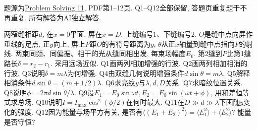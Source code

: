 题源为\href{https://ocw.mit.edu/courses/8-02-physics-ii-electricity-and-magnetism-spring-2007/resources/solving11/}{Problem Solving 11}, PDF第1--12页. Q1--Q12全部保留, 答题页重复题干不再重复. 所有解答为AI独立解答.

\begin{exercise}
两窄缝相距$d$, 在$x=0$平面, 屏在$x=D$, 上缝编号1、下缝编号2. $O$是缝中点向屏作垂线的足点, 正$y$向上, 屏上$P$距$O$的有符号距离为$y$, $\theta$从正$x$轴量到缝中点指向$P$的射线. 两束同频、同偏振、相干的光从缝同相出发, 每束场幅度$E_0$. 第2缝到$P$比第1缝路长$\delta=r_2-r_1$. 采用远场近似.
Q1画两列相加增强的行波.
Q2画两列相加相消的行波.
Q3说明$\delta=m\lambda$为何增强.
Q4由双缝几何说明增强条件$d\sin\theta=m\lambda$.
Q5解释相消条件$d\sin\theta=(m+1/2)\lambda$.
Q6求亮纹$y$与$\lambda,d,D$关系.
Q7求暗纹位置关系.
Q8说明$\phi=2\pi d\sin\theta/\lambda$.
Q9设$E_1=E_0\sin\omega t,E_2=E_0\sin(\omega t+\phi)$, 用和差恒等式求总场.
Q10说明$I=I_{\max}\cos^2(\phi/2)$在何时最大.
Q11在$D\gg d\gg\lambda$下画随$y$变化的强度.
Q12因为能量与场平方有关, 是否有$\langle(E_1+E_2)^2\rangle=\langle E_1^2\rangle+\langle E_2^2\rangle$? 能量是否守恒?
\end{exercise}
